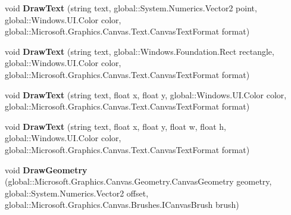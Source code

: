 \begin{DoxyCompactItemize}
\mbox{\label{class_microsoft_1_1_graphics_1_1_canvas_1_1_canvas_drawing_session_a128a0fb083f9d7b12d6d62fae20e6f5d}} 
void {\bfseries Draw\+Text} (string text, global\+::\+System.\+Numerics.\+Vector2 point, global\+::\+Windows.\+U\+I.\+Color color, global\+::\+Microsoft.\+Graphics.\+Canvas.\+Text.\+Canvas\+Text\+Format format)
\item 
\mbox{\label{class_microsoft_1_1_graphics_1_1_canvas_1_1_canvas_drawing_session_a63c809e2423b4b16f9c5960469c7dab6}} 
void {\bfseries Draw\+Text} (string text, global\+::\+Windows.\+Foundation.\+Rect rectangle, global\+::\+Windows.\+U\+I.\+Color color, global\+::\+Microsoft.\+Graphics.\+Canvas.\+Text.\+Canvas\+Text\+Format format)
\item 
\mbox{\label{class_microsoft_1_1_graphics_1_1_canvas_1_1_canvas_drawing_session_a80bd975d84b015fd135219935b6fbfe2}} 
void {\bfseries Draw\+Text} (string text, float x, float y, global\+::\+Windows.\+U\+I.\+Color color, global\+::\+Microsoft.\+Graphics.\+Canvas.\+Text.\+Canvas\+Text\+Format format)
\item 
\mbox{\label{class_microsoft_1_1_graphics_1_1_canvas_1_1_canvas_drawing_session_ad80cc677d80a65650773d85f71d12ef5}} 
void {\bfseries Draw\+Text} (string text, float x, float y, float w, float h, global\+::\+Windows.\+U\+I.\+Color color, global\+::\+Microsoft.\+Graphics.\+Canvas.\+Text.\+Canvas\+Text\+Format format)
\item 
\mbox{\label{class_microsoft_1_1_graphics_1_1_canvas_1_1_canvas_drawing_session_af6ccc8372b7d4df50913a0fa22efb8f1}} 
void {\bfseries Draw\+Geometry} (global\+::\+Microsoft.\+Graphics.\+Canvas.\+Geometry.\+Canvas\+Geometry geometry, global\+::\+System.\+Numerics.\+Vector2 offset, global\+::\+Microsoft.\+Graphics.\+Canvas.\+Brushes.\+I\+Canvas\+Brush brush)
\item 
\mbox{\label{class_microsoft_1_1_graphics_1_1_canvas_1_1_canvas_drawing_session_a93d6e04e19f5c5443c5c174550b9d000}} 

\end{DoxyCompactItemize}

